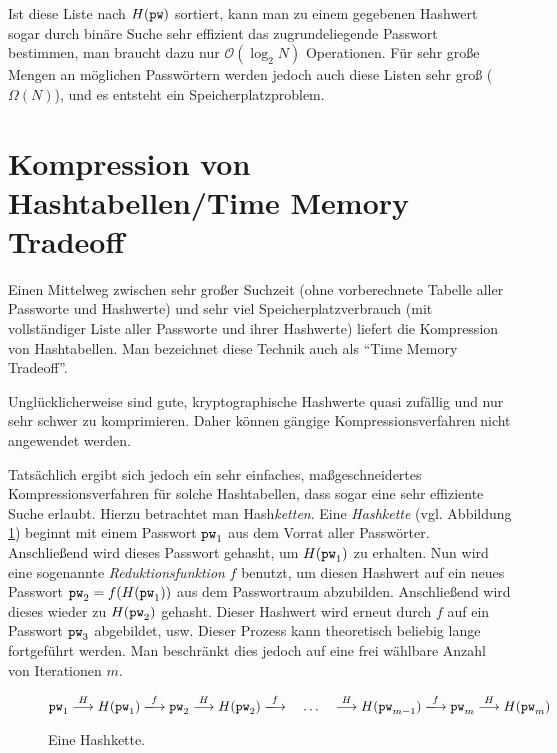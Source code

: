 Ist diese Liste nach $H(\texttt{pw})$ sortiert, kann man zu einem gegebenen Hashwert sogar durch binäre Suche sehr effizient das zugrundeliegende Passwort bestimmen, man braucht dazu nur $\mathcal{O}(\log_2 N)$ Operationen. Für sehr große Mengen an möglichen Passwörtern werden jedoch auch diese Listen sehr groß ($\Omega(N)$), und es entsteht ein Speicherplatzproblem.

\section{Kompression von Hashtabellen/Time Memory Tradeoff}

Einen Mittelweg zwischen sehr großer Suchzeit (ohne vorberechnete Tabelle aller Passworte und Hashwerte) und sehr viel Speicherplatzverbrauch (mit vollständiger Liste aller Passworte und ihrer Hashwerte) liefert die Kompression von Hashtabellen. Man bezeichnet diese Technik auch als "`Time Memory Tradeoff"'.

Unglücklicherweise sind gute, kryptographische Hashwerte quasi zufällig und nur sehr schwer zu komprimieren. Daher können gängige Kompressionsverfahren nicht angewendet werden.

Tatsächlich ergibt sich jedoch ein sehr einfaches, maßgeschneidertes Kompressionsverfahren für solche Hashtabellen, dass sogar eine sehr effiziente Suche erlaubt.
Hierzu betrachtet man Hash\emph{ketten}.
Eine \emph{Hashkette} (vgl. Abbildung \ref{fig:auth:hashchain}) beginnt mit einem Passwort $\texttt{pw}_1$ aus dem Vorrat aller Passwörter.
Anschließend wird dieses Passwort gehasht, um $H(\texttt{pw}_1)$ zu erhalten.
Nun wird eine sogenannte \emph{Reduktionsfunktion} $f$ benutzt, um diesen Hashwert auf ein neues Passwort $\texttt{pw}_2 = f(H(\texttt{pw}_1))$ aus dem Passwortraum abzubilden.
Anschließend wird dieses wieder zu $H(\texttt{pw}_2)$ gehasht.
Dieser Hashwert wird erneut durch $f$ auf ein Passwort $\texttt{pw}_3$ abgebildet, usw.
Dieser Prozess kann theoretisch beliebig lange fortgeführt werden. Man beschränkt dies jedoch auf eine frei wählbare Anzahl von Iterationen $m$.

\newcommand{\RTF}[1][]{\mathit{f}\if!#1!\else_{#1}\fi}
\newcommand{\VRTF}[1][]{\xlongrightarrow{\RTF[#1]}}
\newcommand{\hasharrow}{\stackrel{H}{\longrightarrow}}
\begin{figure}[h]
	\begin{equation*}
		\pw_1 \hasharrow H(\pw_1)
		\VRTF \pw_2 \hasharrow H(\pw_2)
		\VRTF %
		\quad \ldots \quad 
		\hasharrow H(\pw_{m-1})
		\VRTF \pw_m \hasharrow H(\pw_m)
	\end{equation*}
	\caption{Eine Hashkette.}
	\label{fig:auth:hashchain}
\end{figure}

